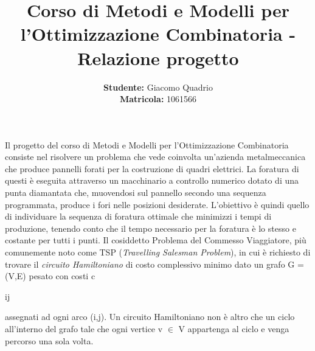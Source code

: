 \documentclass[preprint,12pt]{elsarticle}
\begin{document}
\begin{frontmatter}



\title{Corso di Metodi e Modelli per l'Ottimizzazione Combinatoria - Relazione progetto}


\address{Universit\'a degli studi di Padova \\ Anno Accademico 2015/2016}


\author{\textbf{Studente:} Giacomo Quadrio \\\textbf{Matricola:} 1061566}
\end{frontmatter}


\textbf{\abstractname{}}

Il progetto del corso di Metodi e Modelli per l'Ottimizzazione Combinatoria consiste nel risolvere un problema che vede coinvolta un'azienda metalmeccanica che produce pannelli forati per la costruzione di quadri elettrici. La foratura di questi è eseguita attraverso un macchinario a controllo numerico dotato di una punta diamantata che, muovendosi sul pannello secondo una sequenza programmata, produce i fori nelle posizioni desiderate. L'obiettivo è quindi quello di individuare la sequenza di foratura ottimale che minimizzi i tempi di produzione, tenendo conto che il tempo necessario per la foratura è lo stesso e costante per tutti i punti. Il cosiddetto Problema del Commesso Viaggiatore, più comunemente noto come TSP (\textit{Travelling Salesman Problem}), in cui è richiesto di trovare il \textit{circuito Hamiltoniano} di costo complessivo minimo dato un grafo G = (V,E) pesato con costi c\begin{tiny}ij
\end{tiny} assegnati ad ogni arco (i,j). Un circuito Hamiltoniano non è altro che un ciclo all'interno del grafo tale che ogni vertice v $\in$ V appartenga al ciclo e venga percorso una sola volta. 
\end{document}

